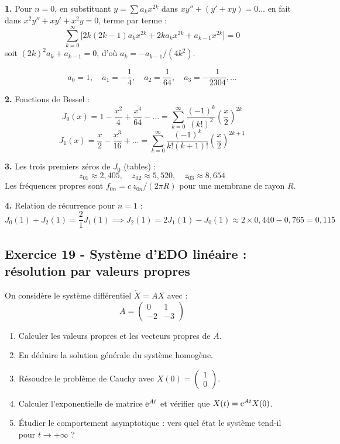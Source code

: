 \documentclass[12pt,a4paper]{article}
\begin{document}
\begin{boitecorrige}
\textbf{1.} Pour $n=0$, en substituant $y = \sum a_k x^{2k}$ dans $xy''+(y'+xy) = 0$... en fait dans $x^2 y''+xy'+x^2 y=0$, terme par terme :
\[
\sum_{k=0}^\infty\bigl[2k(2k-1)a_k x^{2k} + 2ka_k x^{2k} + a_{k-1}x^{2k}\bigr] = 0
\]
soit $(2k)^2 a_k + a_{k-1} = 0$, d'où $a_k = -a_{k-1}/(4k^2)$.

\[
a_0 = 1,\quad a_1 = -\frac{1}{4},\quad a_2 = \frac{1}{64},\quad a_3 = -\frac{1}{2304},\ldots
\]

\textbf{2.} Fonctions de Bessel :
\[
J_0(x) = 1 - \frac{x^2}{4} + \frac{x^4}{64} - \ldots = \sum_{k=0}^\infty \frac{(-1)^k}{(k!)^2}\left(\frac{x}{2}\right)^{2k}
\]
\[
J_1(x) = \frac{x}{2} - \frac{x^3}{16} + \ldots = \sum_{k=0}^\infty \frac{(-1)^k}{k!(k+1)!}\left(\frac{x}{2}\right)^{2k+1}
\]

\textbf{3.} Les trois premiers zéros de $J_0$ (tables) :
\[
z_{01}\approx 2{,}405,\quad z_{02}\approx 5{,}520,\quad z_{03}\approx 8{,}654
\]
Les fréquences propres sont $f_{0n} = c\, z_{0n}/(2\pi R)$ pour une membrane de rayon $R$.

\textbf{4.} Relation de récurrence pour $n=1$ :
\[
J_0(1) + J_2(1) = \frac{2}{1}J_1(1) \implies J_2(1) = 2J_1(1) - J_0(1)\approx 2\times0{,}440 - 0{,}765 = 0{,}115
\]
\end{boitecorrige}

\subsection*{Exercice 19 - Système d'EDO linéaire : résolution par valeurs propres \niveau{\difficile}}

\begin{boiteexercice}
On considère le système différentiel $\dot{X} = AX$ avec :
\[
A = \begin{pmatrix}0 & 1 \\ -2 & -3\end{pmatrix}
\]
\begin{enumerate}
  \item Calculer les valeurs propres et les vecteurs propres de $A$.
  \item En déduire la solution générale du système homogène.
  \item Résoudre le problème de Cauchy avec $X(0) = \begin{pmatrix}1\\0\end{pmatrix}$.
  \item Calculer l'exponentielle de matrice $\mathrm{e}^{At}$ et vérifier que $X(t) = \mathrm{e}^{At}X(0)$.
  \item Étudier le comportement asymptotique : vers quel état le système tend-il pour $t\to+\infty$ ?
\end{enumerate}
\end{boiteexercice}
\end{document}
